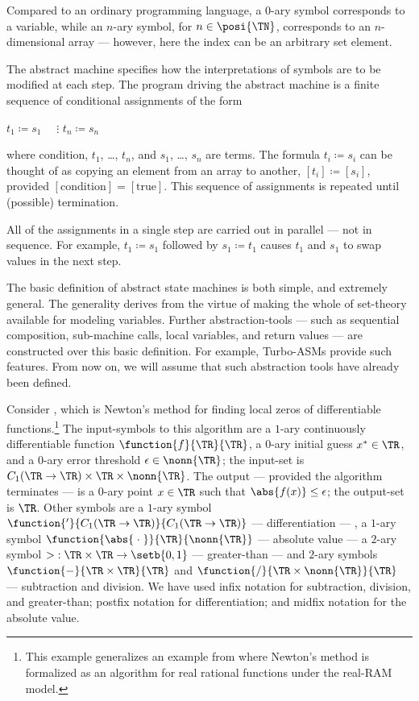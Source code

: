\documentclass[b5paper, english, oneside]{memoir}
\begin{document}
Compared to an ordinary programming language, a $0$-ary symbol corresponds to a variable, while an $n$-ary symbol, for $n \in \posi{\TN}$, corresponds to an $n$-dimensional array --- however, here the index can be an arbitrary set element. 

The abstract machine specifies how the interpretations of symbols are to be modified at each step. The program driving the abstract machine is a finite sequence of conditional assignments of the form 
\begin{algorithmic}
\State $t_1 \coloneqq s_1$
\State $\quad \vdots$
\State $t_n \coloneqq s_n$
\EndIf
\end{algorithmic}
where $\textrm{condition}$, $t_1$, \dots, $t_n$, and $s_1$, \dots, $s_n$ are terms. The formula $t_i \coloneqq s_i$ can be thought of as copying an element from an array to another, $[t_i] \coloneqq [s_i]$, provided $[\textrm{condition}] = [\textrm{true}]$. This sequence of assignments is repeated until (possible) termination. 

All of the assignments in a single step are carried out in parallel --- not in sequence. For example, $t_1 \coloneqq s_1$ followed by $s_1 \coloneqq t_1$ causes $t_1$ and $s_1$ to swap values in the next step.

The basic definition of abstract state machines is both simple, and extremely general. The generality derives from the virtue of making the whole of set-theory available for modeling variables. Further abstraction-tools --- such as sequential composition, sub-machine calls, local variables, and return values --- are constructed over this basic definition. For example, Turbo-ASMs \cite{ASMBook} provide such features. From now on, we will assume that such abstraction tools have already been defined.

Consider , which is Newton's method for finding local zeros of differentiable functions.\footnote{This example generalizes an example from \cite{RealRam} where Newton's method is formalized as an algorithm for real rational functions under the real-RAM model.} The input-symbols to this algorithm are a $1$-ary continuously differentiable function $\function{f}{\TR}{\TR}$, a $0$-ary initial guess $x^* \in \TR$, and a $0$-ary error threshold $\epsilon \in \nonn{\TR}$; the input-set is $C_1(\TR \to \TR) \times \TR \times \nonn{\TR}$. The output --- provided the algorithm terminates --- is a $0$-ary point $x \in \TR$ such that $\abs{f(x)} \leq \epsilon$; the output-set is $\TR$. Other symbols are a $1$-ary symbol $\function{'}{C_1(\TR \to \TR)}{C_1(\TR \to \TR)}$ --- differentiation  --- , a $1$-ary symbol $\function{\abs{\; \cdot \;}}{\TR}{\nonn{\TR}}$ --- absolute value --- a $2$-ary symbol $> \; : \TR \times \TR \to \setb{0, 1}$ --- greater-than --- and $2$-ary symbols $\function{-}{\TR \times \TR}{\TR}$ and $\function{/}{\TR \times \nonn{\TR}}{\TR}$ --- subtraction and division. We have used infix notation for subtraction, division, and greater-than; postfix notation for differentiation; and midfix notation for the absolute value.
\end{document}
